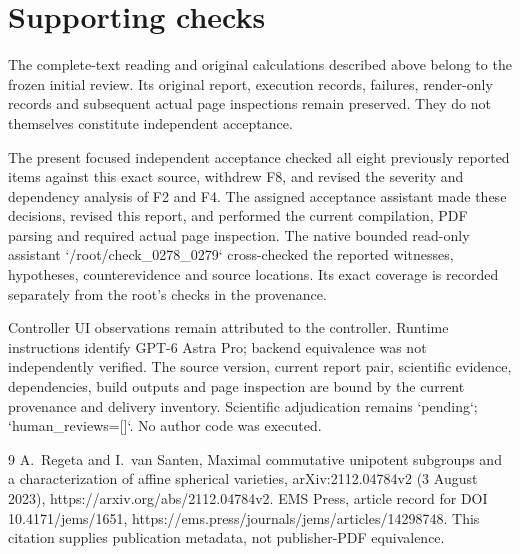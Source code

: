 \documentclass[10pt]{article}
\begin{document}
\section*{Supporting checks}
The complete-text reading and original calculations described above belong to the frozen initial review. Its original report, execution records, failures, render-only records and subsequent actual page inspections remain preserved. They do not themselves constitute independent acceptance.\par
The present focused independent acceptance checked all eight previously reported items against this exact source, withdrew F8, and revised the severity and dependency analysis of F2 and F4. The assigned acceptance assistant made these decisions, revised this report, and performed the current compilation, PDF parsing and required actual page inspection. The native bounded read-only assistant `/root/check\_0278\_0279` cross-checked the reported witnesses, hypotheses, counterevidence and source locations. Its exact coverage is recorded separately from the root’s checks in the provenance.\par
Controller UI observations remain attributed to the controller. Runtime instructions identify GPT-6 Astra Pro; backend equivalence was not independently verified. The source version, current report pair, scientific evidence, dependencies, build outputs and page inspection are bound by the current provenance and delivery inventory. Scientific adjudication remains `pending`; `human\_reviews=[]`. No author code was executed.\par
9 A. Regeta and I. van Santen, Maximal commutative unipotent subgroups and a characterization of affine spherical varieties, arXiv:2112.04784v2 (3 August 2023), https://arxiv.org/abs/2112.04784v2. EMS Press, article record for DOI 10.4171/jems/1651, https://ems.press/journals/jems/articles/14298748. This citation supplies publication metadata, not publisher-PDF equivalence.\par
\end{document}

